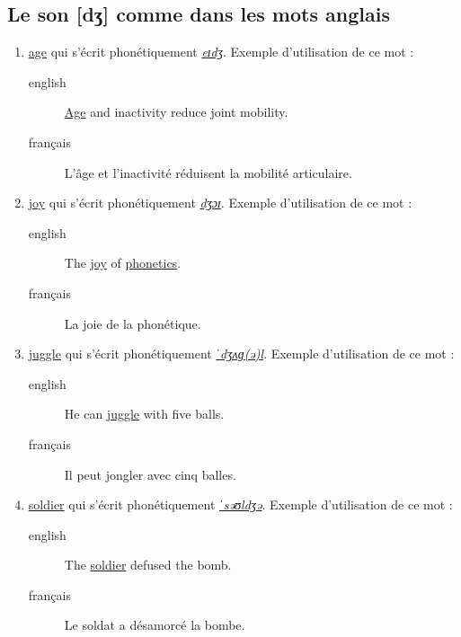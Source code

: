 \documentclass[12pt,a4paper]{book}
\begin{document}
\subsection{Le son [dʒ] comme dans les mots anglais}
\label{sec:org83b259c}
\begin{enumerate}
\item \href{http://www.wordreference.com/enfr/age}{age} qui s'écrit phonétiquement \href{https://en.oxforddictionaries.com/definition/age}{\emph{eɪdʒ}}. Exemple d'utilisation de ce
mot :
\begin{description}
\item[{english}] \textenglish{\href{https://youtu.be/wKU5khnuY\_Y}{Age} and inactivity reduce joint mobility.}
\item[{français}] L'âge et l'inactivité réduisent la mobilité
articulaire.
\end{description}
\item \href{http://www.wordreference.com/enfr/joy}{joy} qui s'écrit phonétiquement \href{https://en.oxforddictionaries.com/definition/joy}{\emph{dʒɔɪ}}. Exemple d'utilisation de ce
mot :
\begin{description}
\item[{english}] \textenglish{The \href{https://youtu.be/TyYIxGL2p6c}{joy} of \href{https://www.amazon.fr/gp/product/B013RQ72R2/ref=as\_li\_tl?ie=UTF8\&camp=1642\&creative=6746\&creativeASIN=B013RQ72R2\&linkCode=as2\&tag=wwwbecomefree-21\&linkId=e8ebecacb076d66dd3e5a435789050d5}{phonetics}.}
\item[{français}] La joie de la phonétique.
\end{description}
\item \href{http://www.wordreference.com/enfr/juggle}{juggle} qui s'écrit phonétiquement \href{https://en.oxforddictionaries.com/definition/juggle}{\emph{ˈdʒʌɡ(ə)l}}. Exemple
d'utilisation de ce mot :
\begin{description}
\item[{english}] \textenglish{He can \href{https://youtu.be/kCt1bmSASCI}{juggle} with five balls.}
\item[{français}] Il peut jongler avec cinq balles.
\end{description}
\item \href{http://www.wordreference.com/enfr/soldier}{soldier} qui s'écrit phonétiquement \href{https://en.oxforddictionaries.com/definition/soldier}{\emph{ˈsəʊldʒə}}. Exemple
d'utilisation de ce mot : 
\begin{description}
\item[{english}] \textenglish{The \href{https://youtu.be/ucoSdNM2Atw}{soldier} defused the bomb.}
\item[{français}] Le soldat a désamorcé la bombe.
\end{description}
\end{enumerate}
\end{document}

